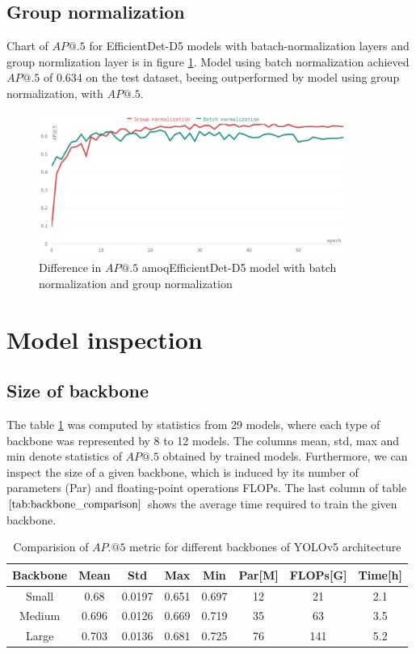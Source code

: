\subsection{Group normalization}
Chart of $AP@.5$ for EfficientDet-D5 models with batach-normalization layers and group normlization layer is in figure \ref{fig:batch_group_diff}. Model using batch normalization achieved $AP@.5$ of 0.634 on the test dataset, beeing outperformed by model using group normalization, with $AP@.5$.
\begin{figure}[H]
    \centering
    \includegraphics[width=0.9\textwidth]{images/group_norm_batch_norm.png}
    \caption{Difference in $AP@.5$ amoqEfficientDet-D5 model with batch normalization and group normalization}
    \label{fig:batch_group_diff}
\end{figure}

\section{Model inspection}
\label{sec:model_inspection_results}
\subsection{Size of backbone}
The table \ref{tab:backbone_comparison} was computed by statistics from 29 models, where each type of backbone was represented by 8 to 12 models. The columns mean, std, max and min denote statistics of $AP@.5$ obtained by trained models. Furthermore, we can inspect the size of a given backbone, which is induced by its number of parameters (Par) and floating-point operations FLOPs. The last column of table $\ref{tab:backbone_comparison}$ shows the average time required to train the given backbone.
\begin{table}[H]
    \begin{tabular}{|c|c|c|c|c|c|c|c|}
        \hline
        Backbone & Mean  & Std    & Max   & Min   & Par[M] & FLOPs[G] & Time[h] \\ \hline
        Small    & 0.68  & 0.0197 & 0.651 & 0.697 & 12     & 21       & 2.1     \\ \hline
        Medium   & 0.696 & 0.0126 & 0.669 & 0.719 & 35     & 63       & 3.5     \\ \hline
        Large    & 0.703 & 0.0136 & 0.681 & 0.725 & 76     & 141      & 5.2     \\ \hline
    \end{tabular}
    \caption{Comparision of $AP.@5$ metric for different backbones of YOLOv5 architecture}
    \label{tab:backbone_comparison}
\end{table}

